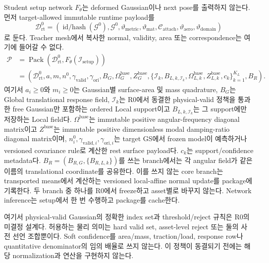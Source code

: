 \documentclass[11pt]{article}
\begin{document}
Student setup network \(F_\theta\)는 deformed Gaussian이나 next pose를 출력하지 않는다. 먼저
target-allowed immutable runtime payload를
\[
  \mathcal D_{\mathrm{rt}}^0=\left(\operatorname{id/hash}(\mathcal G^0),\mathcal G^0,
  \vartheta_{\mathrm{metric}},\vartheta_{\mathrm{mat}},\mathcal C_{\mathrm{attach}},
  \vartheta_{\mathrm{aero}},\vartheta_{\mathrm{domain}}\right)
\]
로 둔다. Teacher mesh에서 복사한 normal, validity, area 또는 correspondence는 여기에 들어갈 수 없다.
\begin{equation}
  \begin{aligned}
  \mathcal P&=\operatorname{Pack}\!\left(\mathcal D_{\mathrm{rt}}^0,F_\theta(\mathcal I_{\mathrm{setup}})\right)\\
  &=\left(\mathcal D_{\mathrm{rt}}^0,a,m,n^0,\gamma_{\mathrm{valid}},\gamma_{\mathrm{ori}},
  B_G,\Omega_G^{\mathrm{base}},Z_G^{\mathrm{base}},
  \{\mathcal I_k,B_{L,k,\mathcal I_k},\Omega_{L,k}^{\mathrm{base}},
  Z_{L,k}^{\mathrm{base}},c_k\}_{k=1}^{K_L},B_R\right).
  \end{aligned}
  \label{eq:rd-response-package}
\end{equation}
여기서 \(a_i\ge0\)와 \(m_i\ge0\)는 Gaussian별 surface-area 및 mass quadrature,
\(B_G\)는 Global translational response field, \(\mathcal I_k\)는 R0에서 동결한 physical-valid
정책을 통과한 free Gaussian만 포함하는 ordered Local support이고
\(B_{L,k,\mathcal I_k}\)는 그 support에만 저장하는 Local field다.
\(\Omega^{\mathrm{base}}\)는 immutable positive angular-frequency diagonal matrix이고
\(Z^{\mathrm{base}}\)는 immutable positive dimensionless modal damping-ratio diagonal matrix이며,
\(n_i^0,\gamma_{\mathrm{valid},i},\gamma_{\mathrm{ori},i}\)는 target GS에서 frozen model이 예측하거나
versioned covariance rule로 계산한 rest surface payload다. \(c_k\)는 support/confidence metadata다.
\(B_R=(B_{R,G},\{B_{R,L,k}\})\)를 쓰는 branch에서는 각 angular field가 같은 이름의 translational
coordinate를 공유한다. 이를 쓰지 않는 core branch는 transported means에서 계산하는 versioned local-affine
normal update를 package에 기록한다. 두 branch 중 하나를 R0에서 freeze하고 asset별로 바꾸지 않는다.
Network inference는 setup에서 한 번 수행하고 package를 cache한다.

여기서 physical-valid Gaussian의 정확한 index set과 threshold/reject 규칙은 R0의 미결정 설계다.
허용하는 물리 의미는 hard valid set, asset-level reject 또는 둘의 사전 선언 조합뿐이다.
Soft confidence를 area/mass, traction/load, response row나 quantitative denominator의 임의 배율로 쓰지 않는다.
이 정책이 동결되기 전에는 해당 normalization과 연산을 구현하지 않는다.
\end{document}
